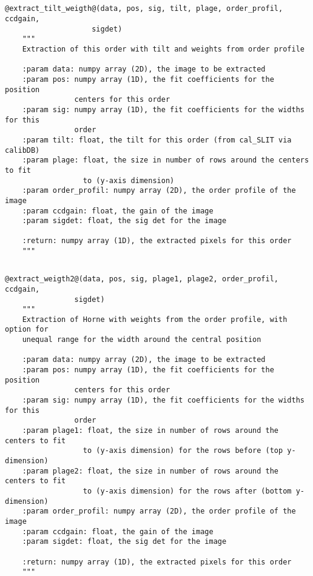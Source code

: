 \subsection{}
\begin{lstlisting}[style=pythonstyle]
@extract_tilt_weigth@(data, pos, sig, tilt, plage, order_profil, ccdgain,
                    sigdet)
    """
    Extraction of this order with tilt and weights from order profile
    
    :param data: numpy array (2D), the image to be extracted
    :param pos: numpy array (1D), the fit coefficients for the position
                centers for this order
    :param sig: numpy array (1D), the fit coefficients for the widths for this
                order
    :param tilt: float, the tilt for this order (from cal_SLIT via calibDB)
    :param plage: float, the size in number of rows around the centers to fit
                  to (y-axis dimension)
    :param order_profil: numpy array (2D), the order profile of the image
    :param ccdgain: float, the gain of the image
    :param sigdet: float, the sig det for the image

    :return: numpy array (1D), the extracted pixels for this order
    """
\end{lstlisting}

\subsection{}
\begin{lstlisting}[style=pythonstyle]
@extract_weigth2@(data, pos, sig, plage1, plage2, order_profil, ccdgain,
                sigdet)
    """
    Extraction of Horne with weights from the order profile, with option for
    unequal range for the width around the central position

    :param data: numpy array (2D), the image to be extracted
    :param pos: numpy array (1D), the fit coefficients for the position
                centers for this order
    :param sig: numpy array (1D), the fit coefficients for the widths for this
                order
    :param plage1: float, the size in number of rows around the centers to fit
                  to (y-axis dimension) for the rows before (top y-dimension)
    :param plage2: float, the size in number of rows around the centers to fit
                  to (y-axis dimension) for the rows after (bottom y-dimension)
    :param order_profil: numpy array (2D), the order profile of the image
    :param ccdgain: float, the gain of the image
    :param sigdet: float, the sig det for the image

    :return: numpy array (1D), the extracted pixels for this order
    """
\end{lstlisting}

